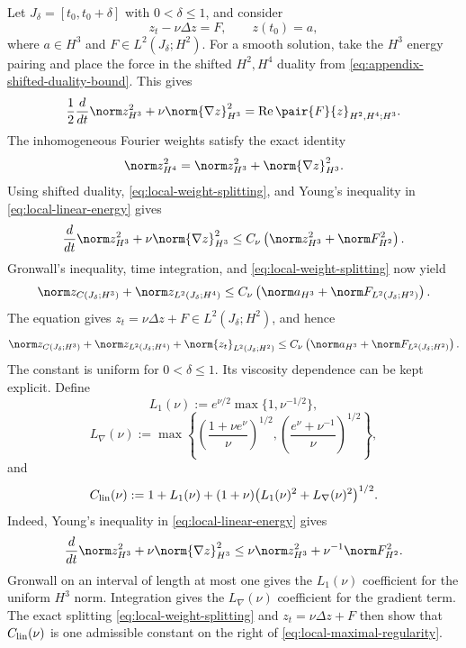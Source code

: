 Let \(J_\delta=[t_0,t_0+\delta]\) with \(0<\delta\le1\), and consider
\[
 z_t-\nu\Delta z=F,
 \qquad
 z(t_0)=a,
\]
where \(a\in H^3\) and \(F\in L^2(J_\delta;H^2)\).
For a smooth solution, take the \(H^3\) energy pairing and place the force in the shifted \(H^2,H^4\) duality from \eqref{eq:appendix-shifted-duality-bound}.
This gives
\begin{equation}
 \frac12\frac d{dt}\norm z_{H^3}^2
 +\nu\norm{\nabla z}_{H^3}^2
 =\operatorname{Re}\pair{F}{z}_{H^2,H^4;H^3}.
 \label{eq:local-linear-energy}
\end{equation}
The inhomogeneous Fourier weights satisfy the exact identity
\begin{equation}
 \norm z_{H^4}^2
 =\norm z_{H^3}^2+\norm{\nabla z}_{H^3}^2.
 \label{eq:local-weight-splitting}
\end{equation}
Using shifted duality, \eqref{eq:local-weight-splitting}, and Young's inequality in \eqref{eq:local-linear-energy} gives
\[
 \frac d{dt}\norm z_{H^3}^2
 +\nu\norm{\nabla z}_{H^3}^2
 \le C_\nu\left(\norm z_{H^3}^2+\norm F_{H^2}^2\right).
\]
Gronwall's inequality, time integration, and \eqref{eq:local-weight-splitting} now yield
\[
 \norm z_{C(J_\delta;H^3)}
 +\norm z_{L^2(J_\delta;H^4)}
 \le C_\nu\left(\norm a_{H^3}+\norm F_{L^2(J_\delta;H^2)}\right).
\]
The equation gives \(z_t=\nu\Delta z+F\in L^2(J_\delta;H^2)\), and hence
\begin{equation}
 \norm z_{C(J_\delta;H^3)}
 +\norm z_{L^2(J_\delta;H^4)}
 +\norm{z_t}_{L^2(J_\delta;H^2)}
 \le C_\nu\left(\norm a_{H^3}+\norm F_{L^2(J_\delta;H^2)}\right).
 \label{eq:local-maximal-regularity}
\end{equation}
The constant is uniform for \(0<\delta\le1\).  Its viscosity dependence can
be kept explicit.  Define
\[
 L_1(\nu):=e^{\nu/2}\max\{1,\nu^{-1/2}\},
\]
\[
 L_\nabla(\nu)
 :=\max\left\{
 \left(\frac{1+\nu e^\nu}{\nu}\right)^{1/2},
 \left(\frac{e^\nu+\nu^{-1}}{\nu}\right)^{1/2}
 \right\},
\]
and
\begin{equation}
 C_{\rm lin}(\nu)
 :=1+L_1(\nu)
 +(1+\nu)\bigl(L_1(\nu)^2+L_\nabla(\nu)^2\bigr)^{1/2}.
 \label{eq:explicit-linear-local-constant}
\end{equation}
Indeed, Young's inequality in \eqref{eq:local-linear-energy} gives
\[
 \frac d{dt}\norm z_{H^3}^2
 +\nu\norm{\nabla z}_{H^3}^2
 \le\nu\norm z_{H^3}^2+\nu^{-1}\norm F_{H^2}^2.
\]
Gronwall on an interval of length at most one gives the \(L_1(\nu)\)
coefficient for the uniform \(H^3\) norm.  Integration gives the
\(L_\nabla(\nu)\) coefficient for the gradient term.  The exact splitting
\eqref{eq:local-weight-splitting} and
\(z_t=\nu\Delta z+F\) then show that \(C_{\rm lin}(\nu)\) is one admissible
constant on the right of \eqref{eq:local-maximal-regularity}.

